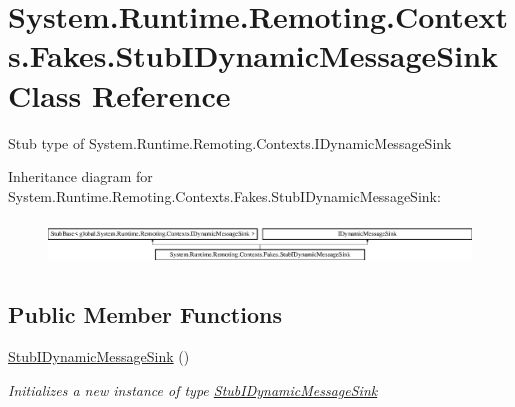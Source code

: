 \hypertarget{class_system_1_1_runtime_1_1_remoting_1_1_contexts_1_1_fakes_1_1_stub_i_dynamic_message_sink}{\section{System.\-Runtime.\-Remoting.\-Contexts.\-Fakes.\-Stub\-I\-Dynamic\-Message\-Sink Class Reference}
\label{class_system_1_1_runtime_1_1_remoting_1_1_contexts_1_1_fakes_1_1_stub_i_dynamic_message_sink}
}


Stub type of System.\-Runtime.\-Remoting.\-Contexts.\-I\-Dynamic\-Message\-Sink 


Inheritance diagram for System.\-Runtime.\-Remoting.\-Contexts.\-Fakes.\-Stub\-I\-Dynamic\-Message\-Sink\-:\begin{figure}[H]
\begin{center}
\leavevmode
\includegraphics[height=1.214751cm]{class_system_1_1_runtime_1_1_remoting_1_1_contexts_1_1_fakes_1_1_stub_i_dynamic_message_sink}
\end{center}
\end{figure}
\subsection*{Public Member Functions}
\begin{DoxyCompactItemize}
\item 
\hyperlink{class_system_1_1_runtime_1_1_remoting_1_1_contexts_1_1_fakes_1_1_stub_i_dynamic_message_sink_aa31a1f909e6ebd9f47898fd4465460f4}{Stub\-I\-Dynamic\-Message\-Sink} ()
\begin{DoxyCompactList}\small\item\em Initializes a new instance of type \hyperlink{class_system_1_1_runtime_1_1_remoting_1_1_contexts_1_1_fakes_1_1_stub_i_dynamic_message_sink}{Stub\-I\-Dynamic\-Message\-Sink}\end{DoxyCompactList}\end{DoxyCompactItemize}
